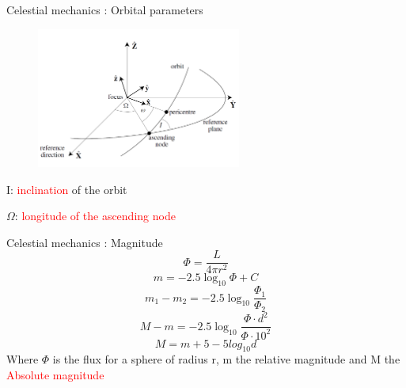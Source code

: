 \documentclass{beamer}
\begin{document}
\begin{frame}{Celestial mechanics \cite{murray1999solar}: Orbital parameters}

\begin{figure}[h]
\begin{center}
\includegraphics[width=0.6\textwidth ]{Pic/Inclination.png}
\caption{\cite{murray1999solar}}
\label{Area_dynamics}
\end{center}
\end{figure}

\begin{center}
I: \textcolor{red}{inclination} of the orbit
\end{center}
\begin{center}
$\Omega$: \textcolor{red}{longitude of the ascending node}
\end{center}
\end{frame}

\begin{frame}{Celestial mechanics \cite{murray1999solar}: Magnitude}
\begin{equation}
\Phi=\frac{L}{4\pi r^{2}}
\end{equation}
\begin{equation}
m=-2.5\log_{10}\Phi+C
\end{equation}
\begin{equation}
m_{1}-m_{2}=-2.5\log_{10}\frac{\Phi_{1}}{\Phi_{2}}
\end{equation}
\begin{equation}
M-m=-2.5\log_{10}\frac{\Phi\cdot d^{2} }{\Phi\cdot 10^{2}}
\end{equation}
\begin{equation}
M=m+5-5log_{10}d
\end{equation}
Where $\Phi$ is the flux for a sphere of radius r, m the relative magnitude and M the \textcolor{red}{Absolute magnitude}
\end{frame}
\end{document}

